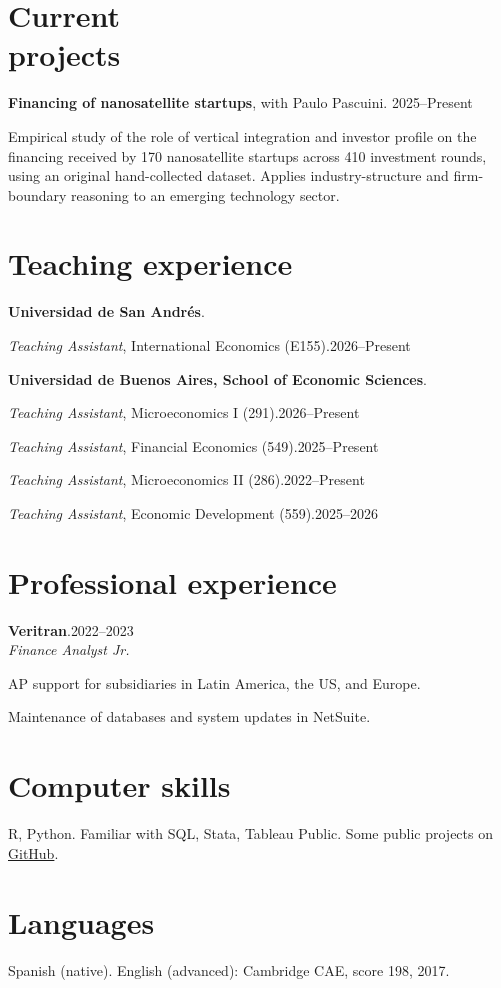 \documentclass[11pt]{article}
\newcommand{\entrydate}[1]{\hfill{\small{#1}}}
\begin{document}
\section{Current\\projects}
\textbf{Financing of nanosatellite startups}, with Paulo Pascuini. \entrydate{2025--Present}
\begin{cvitems}
  \item Empirical study of the role of vertical integration and investor profile on the financing received by 170 nanosatellite startups across 410 investment rounds, using an original hand-collected dataset. Applies industry-structure and firm-boundary reasoning to an emerging technology sector.
\end{cvitems}

\section{Teaching experience}
\textbf{Universidad de San Andrés}.
\begin{cvitems}
  \item \textit{Teaching Assistant}, International Economics (E155).\entrydate{2026--Present}
\end{cvitems}

\textbf{Universidad de Buenos Aires, School of Economic Sciences}.
\begin{cvitems}
  \item \textit{Teaching Assistant}, Microeconomics I (291).\entrydate{2026--Present}
  \item \textit{Teaching Assistant}, Financial Economics (549).\entrydate{2025--Present}
  \item \textit{Teaching Assistant}, Microeconomics II (286).\entrydate{2022--Present}
  \item \textit{Teaching Assistant}, Economic Development (559).\entrydate{2025--2026}
\end{cvitems}

\section{Professional experience}
\textbf{Veritran}.\entrydate{2022--2023}\\
\textit{Finance Analyst Jr.}
\begin{cvitems}
  \item AP support for subsidiaries in Latin America, the US, and Europe.
  \item Maintenance of databases and system updates in NetSuite.
\end{cvitems}

\section{Computer skills}
    R, Python. Familiar with SQL, Stata, Tableau Public. Some public projects on \href{https://www.github.com/sanarovaz/}{GitHub}.
\section{Languages}
Spanish (native). English (advanced): Cambridge CAE, score 198, 2017.
\end{document}
